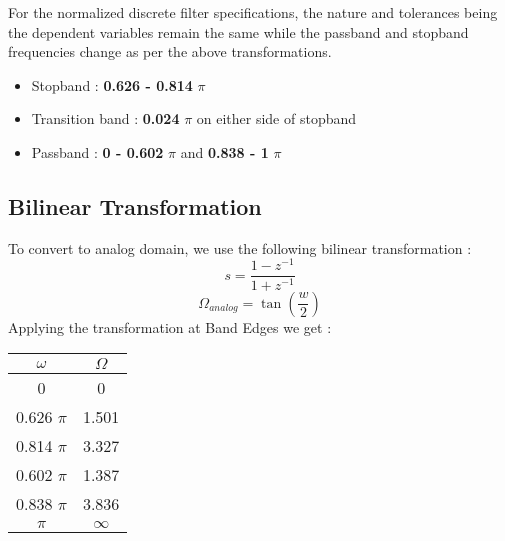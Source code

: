 \documentclass{article}
\begin{document}
\vspace{1em}
\noindent
For the normalized discrete filter specifications, the nature and tolerances being the dependent variables remain the same while the passband and stopband frequencies change as per the above transformations. 
\begin{itemize}
    \item Stopband : \textbf{0.626 -  0.814} {$\pi$}
    \item  Transition band : \textbf{0.024} $\pi$ on either side of stopband
    \item Passband : \textbf{0 - 0.602} {$\pi$} and \textbf{0.838 - 1} {$\pi$}
\end{itemize}

\subsection{Bilinear Transformation}
To convert to analog domain, we use the following bilinear transformation :
\begin{equation*}
    s = \frac{1 - z^{-1}}{1 + z^{-1}}
\end{equation*}
\begin{equation*}
    \Omega_{analog} = \tan (\frac{w}{2})
\end{equation*}
Applying the transformation at Band Edges we get :
\begin{table}[H]
		\begin{center}
		\begin{tabular}{|c|c|}
			\hline
			$\omega$ & $\Omega$\\
			
			\hline
                0 & 0\\
                \hline
                0.626 $\pi$ & 1.501 \\
                \hline
                0.814 $\pi$ & 3.327\\
                \hline
                0.602 $\pi$ & 1.387\\
                \hline
                0.838 $\pi$ & 3.836\\
                \hline
                $\pi$ & $\infty$\\
                \hline
            
		\end{tabular}
		\end{center}
\end{table}
\end{document}
